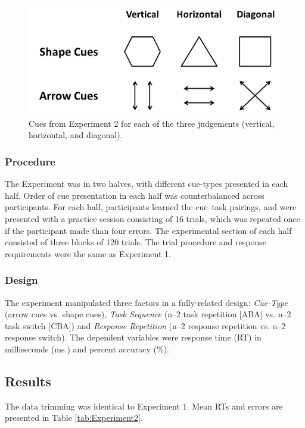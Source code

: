 \documentclass[a4paper, doc, natbib]{apa6}
\begin{document}
\begin{figure}
\begin{center}
\includegraphics[width = \textwidth]{Images/experiment_2_cues.png}
\caption{Cues from Experiment 2 for each of the three judgements (vertical, horizontal, and diagonal).}
\label{fig:cues_Experiment2}
\end{center}
\end{figure}


\subsubsection{Procedure}
The Experiment was in two halves, with different cue-types presented in each half. Order of cue presentation in each half was counterbalanced across participants. For each half, participants learned the cue--task pairings, and were presented with a practice session consisting of 16 trials, which was repeated once if the participant made than four errors. The experimental section of each half consisted of three blocks of 120 trials. The trial procedure and response requirements were the same as Experiment 1. 

\subsubsection{Design}
The experiment manipulated three factors in a fully-related design: \emph{Cue-Type} (arrow cues vs. shape cues), \emph{Task Sequence} (n--2 task repetition [ABA] vs. n--2 task switch [CBA]) and \emph{Response Repetition} (n--2 response repetition vs. n--2 response switch). The dependent variables were response time (RT) in milliseconds (ms.) and percent accuracy (\%).

\subsection{Results}
The data trimming was identical to Experiment 1. Mean RTs and errors are presented in Table \ref{tab:Experiment2}.
\end{document}

